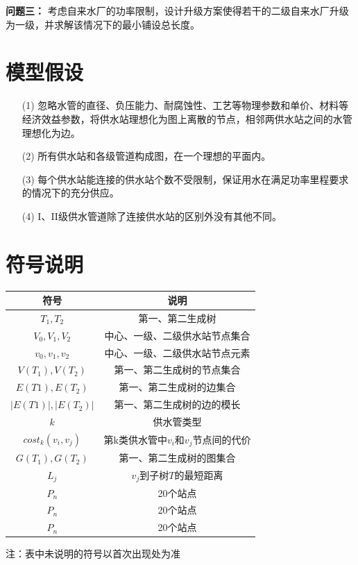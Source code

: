 \documentclass{whutmod}
\begin{document}
			\textbf{问题三：}
            考虑自来水厂的功率限制，设计升级方案使得若干的二级自来水厂升级为一级，并求解该情况下的最小铺设总长度。
	
	\section{模型假设}
		\begin{itemize}                                             
		\item [(1)]忽略水管的直径、负压能力、耐腐蚀性、工艺等物理参数和单价、材料等经济效益参数，将供水站理想化为图上离散的节点，相邻两供水站之间的水管理想化为边。
		\item [(2)]所有供水站和各级管道构成图，在一个理想的平面内。
		\item[(3)]每个供水站能连接的供水站个数不受限制，保证用水在满足功率里程要求的情况下的充分供应。
		\item [(4)]I、II级供水管道除了连接供水站的区别外没有其他不同。
		\end{itemize}

		
	\section{符号说明}
		\begin{table}[H]
		\centering
		\setlength{\tabcolsep}{12mm}
		\begin{tabular}{cc}
			\toprule[1.5pt]
			\multicolumn{1}{m{5cm}}{\centering 符号} & \multicolumn{1}{m{5cm}}{\centering 说明} \\
			\midrule[0.5pt]		
			$T_1,T_2$  & 第一、第二生成树  \\ 
			$V_0,V_1,V_2$  & 中心、一级、二级供水站节点集合  \\ 
			$v_0,v_1,v_2$  & 中心、一级、二级供水站节点元素  \\ 
			$V(T_1),V(T_2)$  & 第一、第二生成树的节点集合 \\ 
		   	$E(T1),E(T_2)$  &第一、第二生成树的边集合\\ 
		   	$|E(T1)|,|E(T_2)|$  & 第一、第二生成树的边的模长 \\ 
		   	$k$  & 供水管类型 \\
		   	$cost_k(v_i,v_j)$  & 第k类供水管中$v_i$和$v_j$节点间的代价 \\ 
		   	$G(T_1),G(T_2)$  &第一、第二生成树的图集合  \\ 
		   	$L_j$  & $v_j$到子树$T$的最短距离  \\ 
		   	$P_n$  & 20个站点  \\ 
		   	$P_n$  & 20个站点  \\ 
		   	$P_n$  & 20个站点  \\ 
			\bottomrule[1.5pt]
		\end{tabular}
		\begin{tablenotes}
		\item 注：表中未说明的符号以首次出现处为准
		\end{tablenotes}
		\end{table}
\end{document}
